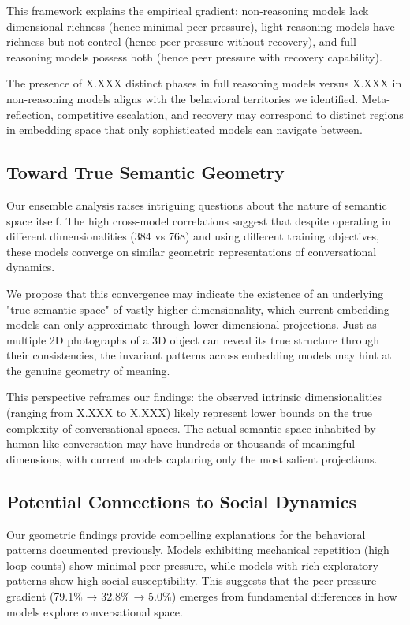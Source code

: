 \documentclass[11pt,letterpaper]{article}
\newcommand{\fullReasoningPeerPressure}{79.1\%}
\newcommand{\lightReasoningPeerPressure}{32.8\%}
\newcommand{\nonReasoningPeerPressure}{5.0\%}
\newcommand{\lightIntrinsicDim}{X.XXX}
\newcommand{\nonIntrinsicDim}{X.XXX}
\newcommand{\fullPhaseCount}{X.XXX}
\newcommand{\nonPhaseCount}{X.XXX}
\newcommand{\miniLMDim}{384}
\newcommand{\mpnetDim}{768}
\begin{document}
This framework explains the empirical gradient: non-reasoning models lack dimensional richness (hence minimal peer pressure), light reasoning models have richness but not control (hence peer pressure without recovery), and full reasoning models possess both (hence peer pressure with recovery capability).

The presence of \fullPhaseCount{} distinct phases in full reasoning models versus \nonPhaseCount{} in non-reasoning models aligns with the behavioral territories we identified. Meta-reflection, competitive escalation, and recovery may correspond to distinct regions in embedding space that only sophisticated models can navigate between.

\subsection{Toward True Semantic Geometry}

Our ensemble analysis raises intriguing questions about the nature of semantic space itself. The high cross-model correlations suggest that despite operating in different dimensionalities (\miniLMDim{} vs \mpnetDim{}) and using different training objectives, these models converge on similar geometric representations of conversational dynamics.

We propose that this convergence may indicate the existence of an underlying "true semantic space" of vastly higher dimensionality, which current embedding models can only approximate through lower-dimensional projections. Just as multiple 2D photographs of a 3D object can reveal its true structure through their consistencies, the invariant patterns across embedding models may hint at the genuine geometry of meaning.

This perspective reframes our findings: the observed intrinsic dimensionalities (ranging from \nonIntrinsicDim{} to \lightIntrinsicDim{}) likely represent lower bounds on the true complexity of conversational spaces. The actual semantic space inhabited by human-like conversation may have hundreds or thousands of meaningful dimensions, with current models capturing only the most salient projections.

\subsection{Potential Connections to Social Dynamics}

Our geometric findings provide compelling explanations for the behavioral patterns documented previously. Models exhibiting mechanical repetition (high loop counts) show minimal peer pressure, while models with rich exploratory patterns show high social susceptibility. This suggests that the peer pressure gradient (\fullReasoningPeerPressure{} → \lightReasoningPeerPressure{} → \nonReasoningPeerPressure{}) emerges from fundamental differences in how models explore conversational space.
\end{document}
